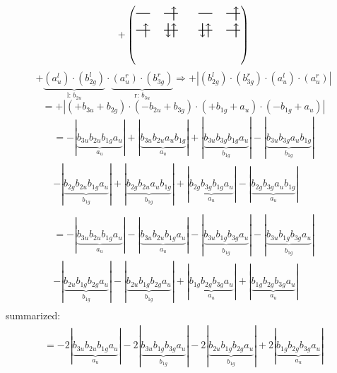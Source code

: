 \documentclass{article}
\begin{document}
\[+\left(\begin{tikzpicture}
    \draw[thick] (0,0) -- (0.5,0); %
    \draw[thick] (1,0) -- (1.5,0); %
    \draw[thick] (0,-0.6) -- (0.5,-0.6); %
    \draw[thick] (1,-0.6) -- (1.5,-0.6); %
\draw[->, thick] (1.35, -0.25) -- (1.35, 0.25); 
\draw[-> , thick] (0.35, -0.85) -- (0.35, -0.35); 
 \draw[-> , thick] (1.35, -0.85) -- (1.35, -0.35); 
\draw[<- , thick] (1.15, -0.85) -- (1.15, -0.35); 
\end{tikzpicture}\qquad \begin{tikzpicture}
    \draw[thick] (0,0) -- (0.5,0); %
    \draw[thick] (1,0) -- (1.5,0); %
    \draw[thick] (0,-0.6) -- (0.5,-0.6); %
    \draw[thick] (1,-0.6) -- (1.5,-0.6); %
\draw[->, thick] (1.35, -0.25) -- (1.35, 0.25); 
\draw[-> , thick] (0.35, -0.85) -- (0.35, -0.35); 
\draw[<- , thick] (0.15, -0.85) -- (0.15, -0.35); 
 \draw[-> , thick] (1.35, -0.85) -- (1.35, -0.35); 
\end{tikzpicture}\right)\]$$+ \underbrace{(a_{u}^{l})\cdot (b_{2g}^{l})}_{\text{l: }b_{2u}}\cdot \underbrace{(a_{u}^{r})\cdot (b_{3g}^{r})}_{\text{r: }b_{3u}}\Rightarrow +\left|(b_{2g}^{l}) \cdot (b_{3g}^{r}) \cdot (a_{u}^{l}) \cdot (a_{u}^{r})\right|$$$$=+\left|(+b_{3u}+b_{2g}) \cdot (-b_{2u}+b_{3g}) \cdot (+b_{1g}+a_{u}) \cdot (-b_{1g}+a_{u})\right|$$\begin{multline*}
=-\left|\underbrace{b_{3u} b_{2u} b_{1g} a_{u}}_{a_{u}}\right|+\left|\underbrace{b_{3u} b_{2u} a_{u} b_{1g}}_{a_{u}}\right|+\left|\underbrace{b_{3u} b_{3g} b_{1g} a_{u}}_{b_{1g}}\right|-\left|\underbrace{b_{3u} b_{3g} a_{u} b_{1g}}_{b_{1g}}\right|\\
-\left|\underbrace{b_{2g} b_{2u} b_{1g} a_{u}}_{b_{1g}}\right|+\left|\underbrace{b_{2g} b_{2u} a_{u} b_{1g}}_{b_{1g}}\right|+\left|\underbrace{b_{2g} b_{3g} b_{1g} a_{u}}_{a_{u}}\right|-\left|\underbrace{b_{2g} b_{3g} a_{u} b_{1g}}_{a_{u}}\right|\\
\end{multline*}\begin{multline*}
=-\left|\underbrace{b_{3u} b_{2u} b_{1g} a_{u}}_{a_{u}}\right|-\left|\underbrace{b_{3u} b_{2u} b_{1g} a_{u}}_{a_{u}}\right|-\left|\underbrace{b_{3u} b_{1g} b_{3g} a_{u}}_{b_{1g}}\right|-\left|\underbrace{b_{3u} b_{1g} b_{3g} a_{u}}_{b_{1g}}\right|\\
-\left|\underbrace{b_{2u} b_{1g} b_{2g} a_{u}}_{b_{1g}}\right|-\left|\underbrace{b_{2u} b_{1g} b_{2g} a_{u}}_{b_{1g}}\right|+\left|\underbrace{b_{1g} b_{2g} b_{3g} a_{u}}_{a_{u}}\right|+\left|\underbrace{b_{1g} b_{2g} b_{3g} a_{u}}_{a_{u}}\right|\\
\end{multline*}summarized:\begin{multline*}
=-2\left|\underbrace{b_{3u} b_{2u} b_{1g} a_{u}}_{a_{u}}\right|-2\left|\underbrace{b_{3u} b_{1g} b_{3g} a_{u}}_{b_{1g}}\right|-2\left|\underbrace{b_{2u} b_{1g} b_{2g} a_{u}}_{b_{1g}}\right|+2\left|\underbrace{b_{1g} b_{2g} b_{3g} a_{u}}_{a_{u}}\right|\\
\end{multline*}\\ \\
\end{document}
